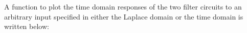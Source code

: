 \documentclass[11pt]{article}
\begin{document}
	

	

	
		
    A function to plot the time domain responses of the two filter circuits
to an arbitrary input specified in either the Laplace domain or the time
domain is written below:

	

	
		
	
	
		
	
		
			
		
	
		
			
		
	
		
			
		
	
		
			
		
	
		
			
		
	
		
			
		
	
		
			
		
	
		
			
		
	
		
			
		
	
		
			
		
	
		
			
		
	
		
			
		
	
		
			
		
	
		
			
		
	
		
			
		
	
		
			
		
	
		
			
		
	
		
			
		
	
		
			
		
	
		
			
		
	
		
			
		
	
		
			
		
	
		
			
		
	
\end{document}
